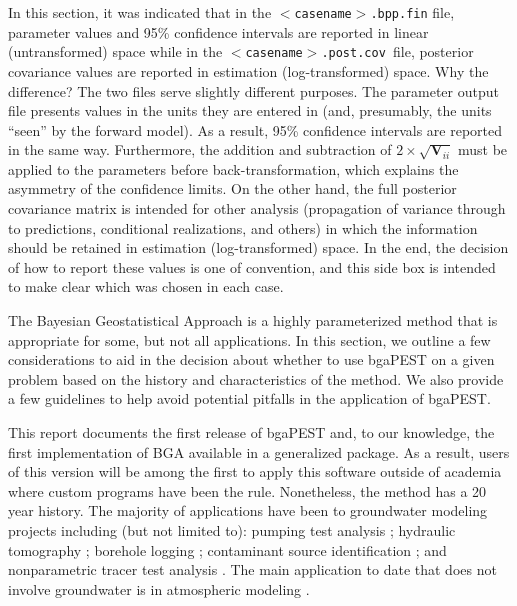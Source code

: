 \documentclass[11pt,oneside,onecolumn]{usgsreport}
\begin{document}
\begin{multicols}{2}
\begin{bibunit}
{\begin{minipage}[t]{0.9\columnwidth}
In this section, it was indicated that in the \texttt{$<$casename$>$.bpp.fin}
file, parameter values and 95\% confidence intervals are reported
in linear (untransformed) space while in the \texttt{$<$casename$>$.post.cov
}file, posterior covariance values are reported in estimation (log-transformed)
space. Why the difference? The two files  serve slightly different
purposes. The parameter output file presents values in the units they
are entered in (and, presumably, the units ``seen'' by the forward
model). As a result, 95\% confidence intervals are reported in the
same way. Furthermore, the addition and subtraction of $2\times\sqrt{\mathbf{V}_{ii}}$
must be applied to the parameters before back-transformation, which
explains the asymmetry of the confidence limits. On the other hand,
the full posterior covariance matrix is intended for other analysis
(propagation of variance through to predictions, conditional realizations,
and others) in which the information should be retained in estimation
(log-transformed) space. In the end, the decision of how to report
these values is one of convention, and this side box is intended to
make clear which was chosen in each case.%
\end{minipage}
}



The Bayesian Geostatistical Approach is a highly parameterized method
that is appropriate for some, but not all applications. In this section,
we outline a few considerations to aid in the decision about whether
to use bgaPEST on a given problem based on the history and characteristics
of the method. We also provide a few guidelines to help avoid potential
pitfalls in the application of bgaPEST.

This report documents the first release of bgaPEST and, to our knowledge,
the first implementation of BGA available in a generalized package.
As a result, users of this version will be among the first to apply
this software outside of academia where custom programs have been
the rule. Nonetheless, the method has a 20 year history. The majority
of applications have been to groundwater modeling projects including
(but not limited to): pumping test analysis \citep{SnodgrassPKK1998};
hydraulic tomography \citep{LiCirpka2007,FienenWRR2008,LiCirpka2008,CardiffPKK2009,cardiff2012};
borehole logging \citep{fienenEtal2004}; contaminant source identification
\citep{SnodgrassPKK1997,MichalakPKK2002a,MichalakPKK2003}; and nonparametric
tracer test analysis \citep{FienenWRR2006}. The main application
to date that does not involve groundwater is in atmospheric modeling
\citep{MIchalak2004,MuellerEtAl2008}. 



\end{bibunit}
\end{multicols}
\end{document}
